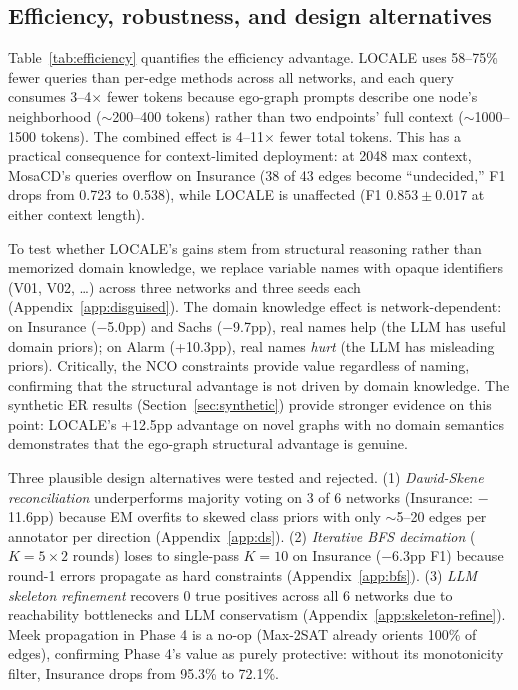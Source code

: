 \documentclass{article}
\begin{document}
\subsection{Efficiency, robustness, and design alternatives}

Table~\ref{tab:efficiency} quantifies the efficiency advantage. LOCALE uses 58--75\% fewer queries than per-edge methods across all networks, and each query consumes 3--4$\times$ fewer tokens because ego-graph prompts describe one node's neighborhood ($\sim$200--400 tokens) rather than two endpoints' full context ($\sim$1000--1500 tokens). The combined effect is 4--11$\times$ fewer total tokens. This has a practical consequence for context-limited deployment: at 2048 max context, MosaCD's queries overflow on Insurance (38 of 43 edges become ``undecided,'' F1 drops from 0.723 to 0.538), while LOCALE is unaffected (F1 $0.853 \pm 0.017$ at either context length).

To test whether LOCALE's gains stem from structural reasoning rather than memorized domain knowledge, we replace variable names with opaque identifiers (V01, V02, \ldots) across three networks and three seeds each (Appendix~\ref{app:disguised}). The domain knowledge effect is network-dependent: on Insurance ($-$5.0pp) and Sachs ($-$9.7pp), real names help (the LLM has useful domain priors); on Alarm (+10.3pp), real names \textit{hurt} (the LLM has misleading priors). Critically, the NCO constraints provide value regardless of naming, confirming that the structural advantage is not driven by domain knowledge. The synthetic ER results (Section~\ref{sec:synthetic}) provide stronger evidence on this point: LOCALE's +12.5pp advantage on novel graphs with no domain semantics demonstrates that the ego-graph structural advantage is genuine.

Three plausible design alternatives were tested and rejected. (1) \textit{Dawid-Skene reconciliation} underperforms majority voting on 3 of 6 networks (Insurance: $-$11.6pp) because EM overfits to skewed class priors with only $\sim$5--20 edges per annotator per direction (Appendix~\ref{app:ds}). (2) \textit{Iterative BFS decimation} ($K{=}5 \times 2$ rounds) loses to single-pass $K{=}10$ on Insurance ($-$6.3pp F1) because round-1 errors propagate as hard constraints (Appendix~\ref{app:bfs}). (3) \textit{LLM skeleton refinement} recovers 0 true positives across all 6 networks due to reachability bottlenecks and LLM conservatism (Appendix~\ref{app:skeleton-refine}). Meek propagation in Phase 4 is a no-op (Max-2SAT already orients 100\% of edges), confirming Phase 4's value as purely protective: without its monotonicity filter, Insurance drops from 95.3\% to 72.1\%.
\end{document}
